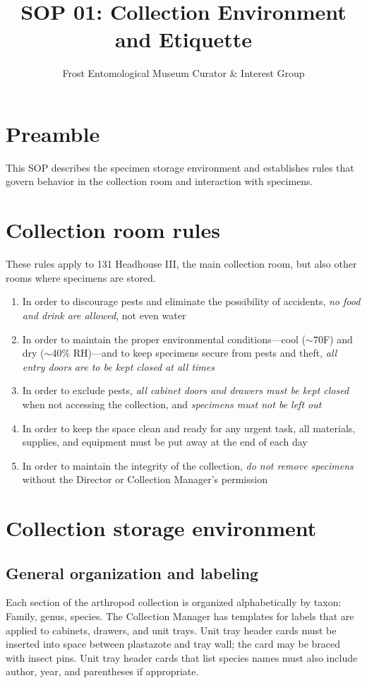 \documentclass[letterpaper, 11pt]{article}
\title{SOP 01: Collection Environment and Etiquette}
\author{Frost Entomological Museum Curator \& Interest Group}
\begin{document}
\cleanlookdateon %
\maketitle
\thispagestyle{fancy}

\section*{Preamble}
This SOP describes the specimen storage environment and establishes rules that govern behavior in the collection room and interaction with specimens.

\section{Collection room rules}

These rules apply to 131 Headhouse III, the main collection room, but also other rooms where specimens are stored.
\begin{enumerate}
\item In order to discourage pests and eliminate the possibility of accidents, \textit{no food and drink are allowed}, not even water
\item In order to maintain the proper environmental conditions---cool ($\sim$70\degree{}F) and dry ($\sim$40\% RH)---and to keep specimens secure from pests and theft, \textit{all entry doors are to be kept closed at all times} 
\item In order to exclude pests, \textit{all cabinet doors and drawers must be kept closed} when not accessing the collection, and \textit{specimens must not be left out}
\item In order to keep the space clean and ready for any urgent task, all materials, supplies, and equipment must be put away at the end of each day
\item In order to maintain the integrity of the collection, \textit{do not remove specimens} without the Director or Collection Manager's permission
\end{enumerate}

\section{Collection storage environment}
\subsection{General organization and labeling}
Each section of the arthropod collection is organized alphabetically by taxon: Family, genus, species. The Collection Manager has templates for labels that are applied to cabinets, drawers, and unit trays. Unit tray header cards must be inserted into space between plastazote and tray wall; the card may be braced with insect pins. Unit tray header cards that list species names must also include author, year, and parentheses if appropriate.
\end{document}
